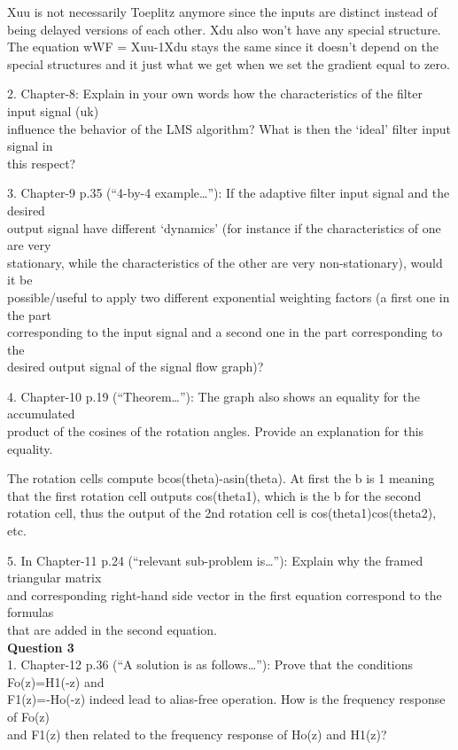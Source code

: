 \documentclass[
  a4paper,
  ,captions=tableheading
]{scrartcl}
\begin{document}
Xuu is not necessarily Toeplitz anymore since the inputs are distinct
instead of being delayed versions of each other. Xdu also won't have any
special structure. The equation wWF = Xuu-1Xdu stays the same since it
doesn't depend on the special structures and it just what we get when we
set the gradient equal to zero.

2. Chapter-8: Explain in your own words how the characteristics of the
filter input signal (uk)\\
influence the behavior of the LMS algorithm? What is then the `ideal'
filter input signal in\\
this respect?

3. Chapter-9 p.35 (``4-by-4 example\ldots{}''): If the adaptive filter
input signal and the desired\\
output signal have different `dynamics' (for instance if the
characteristics of one are very\\
stationary, while the characteristics of the other are very
non-stationary), would it be\\
possible/useful to apply two different exponential weighting factors (a
first one in the part\\
corresponding to the input signal and a second one in the part
corresponding to the\\
desired output signal of the signal flow graph)?

4. Chapter-10 p.19 (``Theorem\ldots''): The graph also shows an equality
for the accumulated\\
product of the cosines of the rotation angles. Provide an explanation
for this equality.

The rotation cells compute bcos(theta)-asin(theta). At first the b is 1
meaning that the first rotation cell outputs cos(theta1), which is the b
for the second rotation cell, thus the output of the 2nd rotation cell
is cos(theta1)cos(theta2), etc.

5. In Chapter-11 p.24 (``relevant sub-problem is\ldots''): Explain why
the framed triangular matrix\\
and corresponding right-hand side vector in the first equation
correspond to the formulas\\
that are added in the second equation.\\
\textbf{Question 3}\\
1. Chapter-12 p.36 (``A solution is as follows\ldots''): Prove that the
conditions Fo(z)=H1(-z) and\\
F1(z)=-Ho(-z) indeed lead to alias-free operation. How is the frequency
response of Fo(z)\\
and F1(z) then related to the frequency response of Ho(z) and H1(z)?
\end{document}
